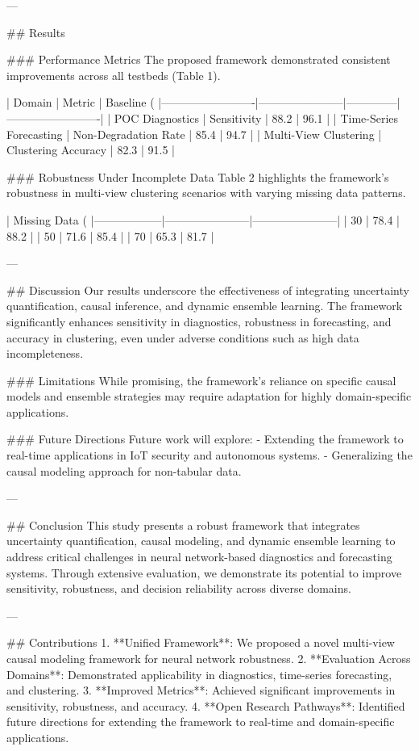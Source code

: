 ---

## Results

### Performance Metrics
The proposed framework demonstrated consistent improvements across all testbeds (Table 1).

| Domain                  | Metric                | Baseline (%
|-------------------------|-----------------------|--------------|-------------------------|
| POC Diagnostics         | Sensitivity          | 88.2         | 96.1                   |
| Time-Series Forecasting | Non-Degradation Rate | 85.4         | 94.7                   |
| Multi-View Clustering   | Clustering Accuracy  | 82.3         | 91.5                   |

### Robustness Under Incomplete Data
Table 2 highlights the framework's robustness in multi-view clustering scenarios with varying missing data patterns.

| Missing Data (%
|------------------|-----------------------|-----------------------|
| 30               | 78.4                 | 88.2                 |
| 50               | 71.6                 | 85.4                 |
| 70               | 65.3                 | 81.7                 |

---

## Discussion
Our results underscore the effectiveness of integrating uncertainty quantification, causal inference, and dynamic ensemble learning. The framework significantly enhances sensitivity in diagnostics, robustness in forecasting, and accuracy in clustering, even under adverse conditions such as high data incompleteness.

### Limitations
While promising, the framework's reliance on specific causal models and ensemble strategies may require adaptation for highly domain-specific applications.

### Future Directions
Future work will explore:
- Extending the framework to real-time applications in IoT security and autonomous systems.
- Generalizing the causal modeling approach for non-tabular data.

---

## Conclusion
This study presents a robust framework that integrates uncertainty quantification, causal modeling, and dynamic ensemble learning to address critical challenges in neural network-based diagnostics and forecasting systems. Through extensive evaluation, we demonstrate its potential to improve sensitivity, robustness, and decision reliability across diverse domains.

---

## Contributions
1. **Unified Framework**: We proposed a novel multi-view causal modeling framework for neural network robustness.
2. **Evaluation Across Domains**: Demonstrated applicability in diagnostics, time-series forecasting, and clustering.
3. **Improved Metrics**: Achieved significant improvements in sensitivity, robustness, and accuracy.
4. **Open Research Pathways**: Identified future directions for extending the framework to real-time and domain-specific applications.